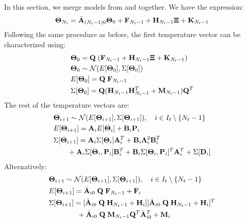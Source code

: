 In this section, we merge models from  and  together. We have the expression:
\[
  \mathbf{\Theta}_{N_t} = \Bar{\mathbf{A}}_{(N_t - 1)0} \mathbf{\Theta}_0 + \mathbf{F}_{N_t - 1} + \mathbf{H}_{N_t - 1} \mathbf{\Xi} + \mathbf{K}_{N_t - 1}
\]
Following the same procedure as before, the first temperature vector can be characterized using:
\begin{align*}
  & \mathbf{\Theta}_0 = \mathbf{Q} \; (\mathbf{F}_{N_t - 1} + \mathbf{H}_{N_t - 1} \mathbf{\Xi} + \mathbf{K}_{N_t - 1}) \\
  & \mathbf{\Theta}_0 \sim \mathcal{N}(E[\mathbf{\Theta}_0], \Sigma[\mathbf{\Theta}_0]) \\
  & E[\mathbf{\Theta}_0] = \mathbf{Q} \; \mathbf{F}_{N_t - 1} \\
  & \Sigma[\mathbf{\Theta}_0] = \mathbf{Q} (\mathbf{H}_{N_t - 1} \mathbf{H}_{N_t - 1}^T + \mathbf{M}_{N_t - 1}) \mathbf{Q}^T
\end{align*}
The rest of the temperature vectors are:
\begin{align*}
  & \mathbf{\Theta}_{i + 1} \sim \mathcal{N}(E[\mathbf{\Theta}_{i + 1}], \Sigma[\mathbf{\Theta}_{i + 1}]), \hspace{10pt} i \in I_t \setminus \{N_t - 1\} \\
  & E[\mathbf{\Theta}_{i+1}] = \mathbf{A}_i E[\mathbf{\Theta}_i] + \mathbf{B}_i \mathbf{P}_i \\
  & \Sigma[\mathbf{\Theta}_{i + 1}] = \mathbf{A}_i \Sigma[\mathbf{\Theta}_i] \mathbf{A}_i^T + \mathbf{B}_i \mathbf{\Lambda}_{i}^2 \mathbf{B}_i^T \\
  & {} \qquad + \mathbf{A}_i \Sigma[\mathbf{\Theta}_i, \mathbf{P}_i] \mathbf{B}_i^T + \mathbf{B}_i \Sigma[\mathbf{\Theta}_i, \mathbf{P}_i]^T \mathbf{A}_i^T + \Sigma[\mathbf{D}_i]
\end{align*}
Alternatively:
\begin{align*}
  & \mathbf{\Theta}_{i + 1} \sim \mathcal{N}(E[\mathbf{\Theta}_{i + 1}], \Sigma[\mathbf{\Theta}_{i + 1}]), \hspace{10pt} i \in I_t \setminus \{N_t - 1\} \\
  & E[\mathbf{\Theta}_{i + 1}] = \Bar{\mathbf{A}}_{i0} \; \mathbf{Q} \; \mathbf{F}_{N_t - 1} + \mathbf{F}_i \\
  & \Sigma[\mathbf{\Theta}_{i + 1}] = [\Bar{\mathbf{A}}_{i0} \; \mathbf{Q} \; \mathbf{H}_{N_t - 1} + \mathbf{H}_i] [\Bar{\mathbf{A}}_{i0} \; \mathbf{Q} \; \mathbf{H}_{N_t - 1} + \mathbf{H}_i]^T \\
  & { } \qquad \qquad + \Bar{\mathbf{A}}_{i0} \; \mathbf{Q} \; \mathbf{M}_{N_t - 1} \mathbf{Q}^T \Bar{\mathbf{A}}_{i0}^T + \mathbf{M}_i
\end{align*}

